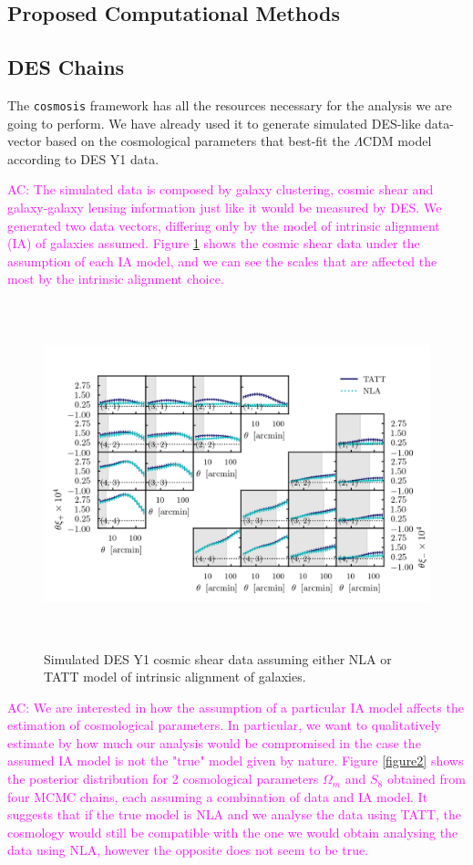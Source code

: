 \documentclass[12pt]{article}
\newcommand{\acampos}[1]{\textcolor{magenta}{AC: #1}}
\begin{document}
\begin{small}
\section{Proposed Computational Methods}
\subsection{DES Chains}

The {\tt cosmosis} framework has all the resources necessary for the analysis we are going to perform. We have already used it to generate simulated DES-like data-vector based on the cosmological parameters that best-fit the $\Lambda$CDM model according to DES Y1 data. 

\acampos{The simulated data is composed by galaxy clustering, cosmic shear and galaxy-galaxy lensing information just like it would be measured by DES. We generated two data vectors, differing only by the model of intrinsic alignment (IA) of galaxies assumed. Figure \ref{figure1} shows the cosmic shear data under the assumption of each IA model, and we can see the scales that are affected the most by the intrinsic alignment choice.}
 
\begin{figure}[!h]
\begin{center}
\includegraphics[height=10cm]{xipm_NLA_TATT.png}
\end{center}
 \caption{Simulated DES Y1 cosmic shear data assuming either NLA or TATT model of intrinsic alignment of galaxies.}
\label{figure1}
\end{figure}

\acampos{We are interested in how the assumption of a particular IA model affects the estimation of cosmological parameters. In particular, we want to qualitatively estimate by how much our analysis would be compromised in the case the assumed IA model is not the "true" model given by nature. Figure \ref{figure2} shows the posterior distribution for 2 cosmological parameters $\Omega_m$ and $S_8$ obtained from four MCMC chains, each assuming a combination of data and IA model. It suggests that if the true model is NLA and we analyse the data using TATT, the cosmology would still be compatible with the one we would obtain analysing the data using NLA, however the opposite does not seem to be true.} 


\end{small}
\end{document}
